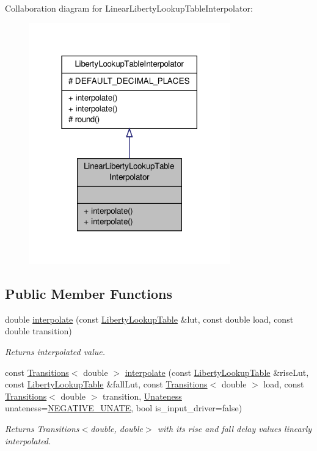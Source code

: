 Collaboration diagram for Linear\-Liberty\-Lookup\-Table\-Interpolator\-:\nopagebreak
\begin{figure}[H]
\begin{center}
\leavevmode
\includegraphics[width=246pt]{classLinearLibertyLookupTableInterpolator__coll__graph}
\end{center}
\end{figure}
\subsection*{Public Member Functions}
\begin{DoxyCompactItemize}
\item 
double \hyperlink{classLinearLibertyLookupTableInterpolator_afd4bc7bfcf9e969478fbc9505b588bf3}{interpolate} (const \hyperlink{structLibertyLookupTable}{Liberty\-Lookup\-Table} \&lut, const double load, const double transition)
\begin{DoxyCompactList}\small\item\em Returns interpolated value. \end{DoxyCompactList}\item 
const \hyperlink{classTransitions}{Transitions}$<$ double $>$ \hyperlink{classLinearLibertyLookupTableInterpolator_a9b0f96185327e7cb0e5c315691eb6579}{interpolate} (const \hyperlink{structLibertyLookupTable}{Liberty\-Lookup\-Table} \&rise\-Lut, const \hyperlink{structLibertyLookupTable}{Liberty\-Lookup\-Table} \&fall\-Lut, const \hyperlink{classTransitions}{Transitions}$<$ double $>$ load, const \hyperlink{classTransitions}{Transitions}$<$ double $>$ transition, \hyperlink{liberty__library_8h_aec44423ef220f800b99f85740d9cc011}{Unateness} unateness=\hyperlink{liberty__library_8h_aec44423ef220f800b99f85740d9cc011a9f0596f72cc1d35d8a8f5a6d75171948}{N\-E\-G\-A\-T\-I\-V\-E\-\_\-\-U\-N\-A\-T\-E}, bool is\-\_\-input\-\_\-driver=false)
\begin{DoxyCompactList}\small\item\em Returns Transitions$<$double, double$>$ with its rise and fall delay values linearly interpolated. \end{DoxyCompactList}\end{DoxyCompactItemize}

